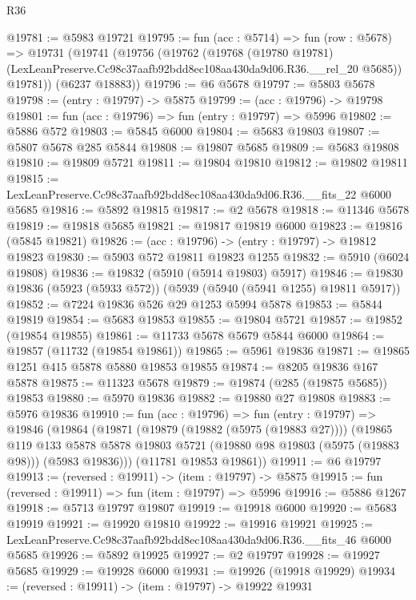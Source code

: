\begin{lexlean}{R36}
\begin{coremodule}
@19781 := @5983 @19721
@19795 := fun (acc : @5714) =>
  fun (row : @5678) =>
  @19731
    (@19741
      (@19756
        (@19762
          (@19768
            (@19780 @19781)
            (LexLeanPreserve.Cc98c37aafb92bdd8ec108aa430da9d06.R36.__rel_20 @5685))
          @19781))
      (@6237 @18883))
@19796 := @6 @5678
@19797 := @5803 @5678
@19798 := (entry : @19797) -> @5875
@19799 := (acc : @19796) -> @19798
@19801 := fun (acc : @19796) => fun (entry : @19797) => @5996
@19802 := @5886 @572
@19803 := @5845 @6000
@19804 := @5683 @19803
@19807 := @5807 @5678 @285 @5844
@19808 := @19807 @5685
@19809 := @5683 @19808
@19810 := @19809 @5721
@19811 := @19804 @19810
@19812 := @19802 @19811
@19815 := LexLeanPreserve.Cc98c37aafb92bdd8ec108aa430da9d06.R36.__fits_22 @6000 @5685
@19816 := @5892 @19815
@19817 := @2 @5678
@19818 := @11346 @5678
@19819 := @19818 @5685
@19821 := @19817 @19819 @6000
@19823 := @19816 (@5845 @19821)
@19826 := (acc : @19796) -> (entry : @19797) -> @19812 @19823
@19830 := @5903 @572 @19811 @19823 @1255
@19832 := @5910 (@6024 @19808)
@19836 := @19832 (@5910 (@5914 @19803) @5917)
@19846 := @19830 @19836 (@5923 (@5933 @572)) (@5939 (@5940 (@5941 @1255) @19811 @5917))
@19852 := @7224 @19836 @526 @29 @1253 @5994 @5878
@19853 := @5844 @19819
@19854 := @5683 @19853
@19855 := @19804 @5721
@19857 := @19852 (@19854 @19855)
@19861 := @11733 @5678 @5679 @5844 @6000
@19864 := @19857 (@11732 (@19854 @19861))
@19865 := @5961 @19836
@19871 := @19865 @1251 @415 @5878 @5880 @19853 @19855
@19874 := @8205 @19836 @167 @5878
@19875 := @11323 @5678
@19879 := @19874 (@285 (@19875 @5685)) @19853
@19880 := @5970 @19836
@19882 := @19880 @27 @19808
@19883 := @5976 @19836
@19910 := fun (acc : @19796) =>
  fun (entry : @19797) =>
  @19846
    (@19864
      (@19871
        (@19879 (@19882 (@5975 (@19883 @27))))
        (@19865
          @119
          @133
          @5878
          @5878
          @19803
          @5721
          (@19880 @98 @19803 (@5975 (@19883 @98)))
          (@5983 @19836)))
      (@11781 @19853 @19861))
@19911 := @6 @19797
@19913 := (reversed : @19911) -> (item : @19797) -> @5875
@19915 := fun (reversed : @19911) => fun (item : @19797) => @5996
@19916 := @5886 @1267
@19918 := @5713 @19797 @19807
@19919 := @19918 @6000
@19920 := @5683 @19919
@19921 := @19920 @19810
@19922 := @19916 @19921
@19925 := LexLeanPreserve.Cc98c37aafb92bdd8ec108aa430da9d06.R36.__fits_46 @6000 @5685
@19926 := @5892 @19925
@19927 := @2 @19797
@19928 := @19927 @5685
@19929 := @19928 @6000
@19931 := @19926 (@19918 @19929)
@19934 := (reversed : @19911) -> (item : @19797) -> @19922 @19931

\end{coremodule}
\end{lexlean}
